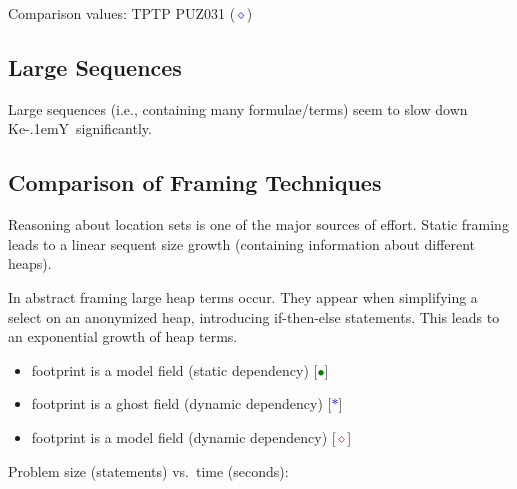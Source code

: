 \documentclass[a4paper]{article}
\newcommand\KeY{Ke\kern-.1emY}
\begin{document}
Comparison values: TPTP PUZ031 (\textcolor{blue}{$\diamond$})

\subsection{Large Sequences}
Large sequences (i.e., containing many formulae/terms) seem to slow
down \KeY\ significantly.

\subsection{Comparison of Framing Techniques}
Reasoning about location sets is one of the major sources of effort.
Static framing leads to a linear sequent size growth
(containing information about different heaps).

In abstract framing large heap terms occur.
They appear when simplifying a select on an anonymized heap,
introducing if-then-else statements.
This leads to an exponential growth of heap terms.

\begin{itemize}
  \item footprint is a model field (static dependency) 
	[\textcolor{green}{$\bullet$}]
  \item footprint is a ghost field (dynamic dependency)
	[\textcolor{blue}{$\ast$}]
  \item footprint is a model field (dynamic dependency)
	[\textcolor{red}{$\diamond$}]
\end{itemize}

Problem size (statements) vs.\ time (seconds):\\
\end{document}
